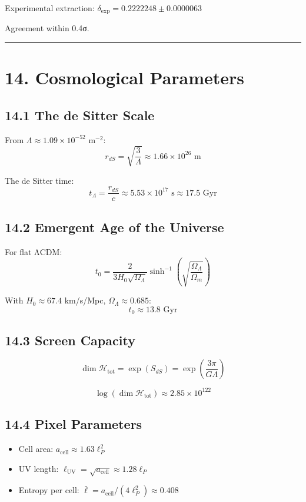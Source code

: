 Experimental extraction: \(\delta_{\text{exp}} = 0.2222248 \pm 0.0000063\)

Agreement within 0.4σ.

\begin{center}\rule{0.5\linewidth}{0.5pt}\end{center}

\section{14. Cosmological Parameters}\label{14-cosmological-parameters}

\subsection{14.1 The de Sitter Scale}\label{141-the-de-sitter-scale}

From \(\Lambda \approx 1.09 \times 10^{-52}\) m\(^{-2}\): \[r_{dS} = \sqrt{\frac{3}{\Lambda}} \approx 1.66 \times 10^{26} \text{ m}\]

The de Sitter time: \[t_\Lambda = \frac{r_{dS}}{c} \approx 5.53 \times 10^{17} \text{ s} \approx 17.5 \text{ Gyr}\]

\subsection{14.2 Emergent Age of the Universe}\label{142-emergent-age-of-the-universe}

For flat ΛCDM: \[t_0 = \frac{2}{3H_0\sqrt{\Omega_\Lambda}} \sinh^{-1}\left(\sqrt{\frac{\Omega_\Lambda}{\Omega_m}}\right)\]

With \(H_0 \approx 67.4\) km/s/Mpc, \(\Omega_\Lambda \approx 0.685\): \[t_0 \approx 13.8 \text{ Gyr}\]

\subsection{14.3 Screen Capacity}\label{143-screen-capacity}

\[\dim \mathcal{H}_{\text{tot}} = \exp(S_{dS}) = \exp\left(\frac{3\pi}{G\Lambda}\right)\]

\[\log(\dim \mathcal{H}_{\text{tot}}) \approx 2.85 \times 10^{122}\]

\subsection{14.4 Pixel Parameters}\label{144-pixel-parameters}

\begin{itemize}
\tightlist
\item
  Cell area: \(a_{\text{cell}} \approx 1.63 \ell_P^2\)
\item
  UV length: \(\ell_{\text{UV}} = \sqrt{a_{\text{cell}}} \approx 1.28 \ell_P\)
\item
  Entropy per cell: \(\bar{\ell} = a_{\text{cell}}/(4\ell_P^2) \approx 0.408\)
\end{itemize}

